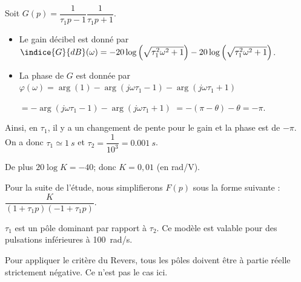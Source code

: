 \ifprof
\begin{corrige}
Soit $G(p)=\dfrac{1}{\tau_1 p - 1}\dfrac{1}{\tau_1 p + 1}$. 
\begin{itemize}
\item Le gain décibel est donné par $\indice{G}{dB}(\omega)= -20\log\left( \sqrt{ \tau_1^2 \omega^2 +1}\right) -20\log\left( \sqrt{ \tau_1^2 \omega^2 +1}\right)$.
\item La phase de $G$ est donnée par $\varphi(\omega) = \arg(1) -\arg\left(j \omega \tau_1 -1 \right)-\arg\left(j \omega \tau_1 +1 \right)$

$= -\arg\left(j \omega \tau_1 -1 \right)-\arg\left(j \omega \tau_1 +1 \right)$ $=-(\pi-\theta)-\theta =-\pi$.
\end{itemize}

Ainsi, en $\tau_1$, il y a un changement de pente pour le gain et la phase est de $-\pi$. On a donc $\tau_1 \simeq \SI{1}{s}$ et $\tau_2 = \dfrac{1}{10^3} = \SI{0,001}{s}$.

De plus $20 \log K=-40$; donc $K = 0,01$ (en rad/V).

\end{corrige}

\else
\fi

Pour la suite de l'étude, nous simplifierons $F(p)$ sous la forme suivante : $\dfrac{K}{\left(1+\tau_{1} p\right)\left(-1+\tau_{1} p\right)}$.

\ifprof
\begin{corrige}

$\tau_1$ est un pôle dominant par rapport à $\tau_2$. Ce modèle est valable pour des pulsations inférieures à \SI{100}{rad/s}.
\end{corrige}
\else
\fi

\ifprof
\begin{corrige}
Pour appliquer le critère du Revers, tous les pôles doivent être à partie réelle strictement négative. Ce n'est pas le cas ici.
\end{corrige}
\else
\fi

